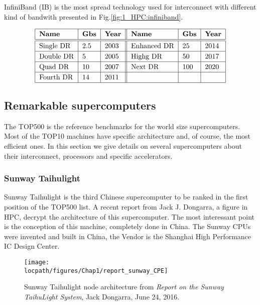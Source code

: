 InfiniBand (IB) is the most spread technology used for interconnect with different kind of bandwith presented in Fig.\ref{fig:1_HPC:infiniband}.

\begin{table}
\begin{center}
\[\arraycolsep=0.pt\def\arraystretch{1.2}
\begin{tabular}{| l | l | l || l | l | l | }
\hline
\textbf{Name} & \textbf{Gbs} & \textbf{Year} & \textbf{Name} & \textbf{Gbs} & \textbf{Year} \\
\hline
\hline
Single DR & 2.5 & 2003 & Enhanced DR & 25 & 2014 \\
\hline
Double DR & 5 & 2005 & Highg DR & 50 & 2017 \\
\hline
Quad DR & 10 & 2007 & Next DR & 100 & 2020 \\
\hline
Fourth DR & 14 & 2011 & & &  \\
\hline
\end{tabular}
\]
\caption{InfiniBand technologies}
\label{fig:1_HPC:infiniband}
\end{center}
\end{table}

\subsection{Remarkable supercomputers}
The TOP500 is the reference benchmarks for the world size supercomputers. 
Most of the TOP10 machines have specific architecture and, of course, the most efficient ones. 
In this section we give details on several supercomputers about their interconnect, processors and specific accelerators. 

\subsubsection{Sunway Taihulight}

Sunway Taihulight is the third Chinese supercomputer to be ranked in the first position of the TOP500 list. 
A recent report from Jack J. Dongarra, a figure in HPC, decrypt the architecture of this supercomputer\cite{dongarra2016report}. 
The most interessant point is the conception of this machine, completely done in China. 
The Sunway CPUs were invented and built in China, the Vendor is the Shanghai High Performance IC Design Center. 

\begin{figure}
\centering
\texttt{[image: \\locpath/figures/Chap1/report\_sunway\_CPE]}
\caption{Sunway Taihulight node architecture from \textit{Report on the Sunway TaihuLight System}, Jack Dongarra, June 24, 2016.}
\label{fig:chap1_report_sunway_CPE}
\end{figure}

